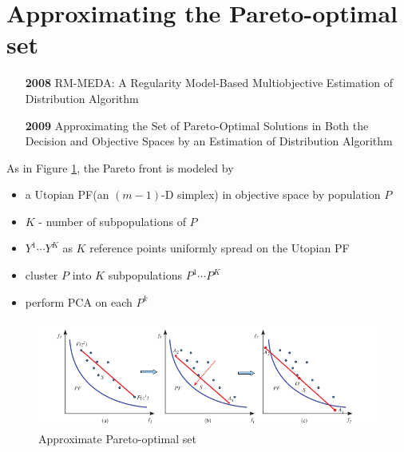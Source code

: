 \section{Approximating the Pareto-optimal set}

\begin{itemize}
\item [\textbf{2008}] RM-MEDA: A Regularity Model-Based Multiobjective Estimation of Distribution Algorithm~\cite{4358761}
\item [\textbf{2009}] Approximating the Set of Pareto-Optimal Solutions in Both the Decision and Objective Spaces by an Estimation of Distribution Algorithm~\cite{5208353}
\end{itemize}

As in Figure \ref{fig:approximate_pareto_optimal}, the Pareto front is modeled by
\begin{itemize}
\item a Utopian PF(an $(m-1)$-D simplex) in objective space by population $ P $
\item $ K $ - number of subpopulations of $ P $
\item $ Y^{1} \cdots Y^{K} $ as $ K $ reference points uniformly spread on the Utopian PF
\item cluster $ P $ into $ K $ subpopulations $ P^{1} \cdots P^{K} $
\item perform PCA on each $ P^{k} $
\end{itemize}

\begin{figure}
\centering
\includegraphics[width=0.7\linewidth]{./img/approximate_pareto_optimal}
\caption{Approximate Pareto-optimal set}
\label{fig:approximate_pareto_optimal}
\end{figure}
